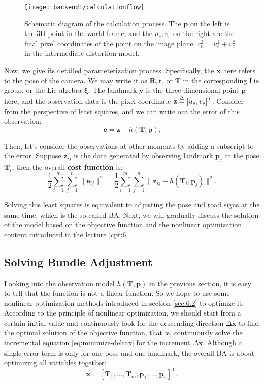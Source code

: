 \begin{figure}[!htp]
	\centering
	\texttt{[image: backend1/calculationflow]}
	\caption{Schematic diagram of the calculation process. The $\mathbf{p}$ on the left is the 3D point in the world frame, and the $u_s, v_s$ on the right are the final pixel coordinates of the point on the image plane. $r_c^2=u_c^2 + v_c^2$ in the intermediate distortion model.}
	\label{fig:calculationflow}
\end{figure}


Now, we give its detailed parameterization process. Specifically, the $\mathbf{x}$ here refers to the pose of the camera. We may write it as $\mathbf{R}, \mathbf{t}$, or $\mathbf{T }$ in the corresponding Lie group, or the  Lie algebra $\mathbf{\xi}$. The landmark $\mathbf{y}$ is the three-dimensional point $\mathbf{p}$ here, and the observation data is the pixel coordinate $\mathbf{z} \buildrel \Delta \over = [u_s, v_s]^T $. Consider from the perspective of least squares, and we can write out the error of this observation:
\begin{equation}
	\mathbf{e} = \mathbf{z} - h(\mathbf{T}, \mathbf{p}).
\end{equation}

Then, let's consider the observations at other moments by adding a subscript to the error. Suppose $\mathbf{z}_{ij}$ is the data generated by observing landmark $\mathbf{p}_j$ at the pose $\mathbf{T}_i$, then the overall \textbf{cost function} is:
\begin{equation}
	\label{eq:BAcostfunction}
	\frac{1}{2}\sum_{i=1}^m \sum_{j=1}^n \| \mathbf{e}_{ij} \|^2 = \frac{1}{2}\sum_{i=1}^m\sum_{j=1}^n \|
	\mathbf{{z}}_{ij} - h(\mathbf{T}_{i},\mathbf{p}_j) \|^2 .
\end{equation}


Solving this least squares is equivalent to adjusting the pose and road signs at the same time, which is the so-called BA. Next, we will gradually discuss the solution of the model based on the objective function and the nonlinear optimization content introduced in the lecture \ref{cpt:6}.

\subsection{Solving Bundle Adjustment}
Looking into the observation model $h(\mathbf{T}, \mathbf{p})$ in the previous section, it is easy to tell that the function is not a linear function. So we hope to use some nonlinear optimization methods introduced in section \ref{sec:6.2} to optimize it. According to the principle of nonlinear optimization, we should start from a certain initial value and continuously look for the descending direction $\Delta \mathbf{x}$ to find the optimal solution of the objective function, that is, continuously solve the incremental equation \eqref{eq:minimize-deltax} for the increment $\Delta \mathbf{x}$. Although a single error term is only for one pose and one landmark, the overall BA is about optimizing all variables together: 
\begin{equation}
	\mathbf{x} = [ \mathbf{T}_1, \ldots, \mathbf{T}_m, \mathbf{p}_1, \ldots, \mathbf{p}_n ]^\mathrm{T}.
\end{equation}


